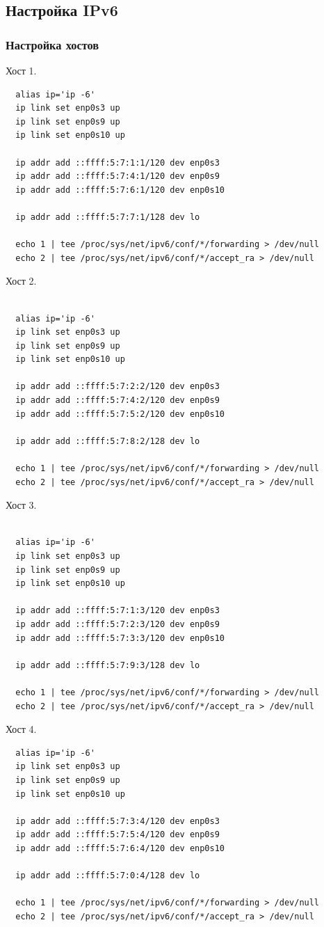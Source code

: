 \documentclass[11pt, a4paper] {ncc}
\begin{document}
    \subsection*{Настройка IPv6}
        \subsubsection*{Настройка хостов}
		Хост 1.
\begin{verbatim}
  alias ip='ip -6'
  ip link set enp0s3 up
  ip link set enp0s9 up
  ip link set enp0s10 up

  ip addr add ::ffff:5:7:1:1/120 dev enp0s3
  ip addr add ::ffff:5:7:4:1/120 dev enp0s9
  ip addr add ::ffff:5:7:6:1/120 dev enp0s10

  ip addr add ::ffff:5:7:7:1/128 dev lo

  echo 1 | tee /proc/sys/net/ipv6/conf/*/forwarding > /dev/null
  echo 2 | tee /proc/sys/net/ipv6/conf/*/accept_ra > /dev/null

\end{verbatim}

	Хост 2.
\begin{verbatim}

  alias ip='ip -6'
  ip link set enp0s3 up
  ip link set enp0s9 up
  ip link set enp0s10 up

  ip addr add ::ffff:5:7:2:2/120 dev enp0s3
  ip addr add ::ffff:5:7:4:2/120 dev enp0s9
  ip addr add ::ffff:5:7:5:2/120 dev enp0s10

  ip addr add ::ffff:5:7:8:2/128 dev lo

  echo 1 | tee /proc/sys/net/ipv6/conf/*/forwarding > /dev/null
  echo 2 | tee /proc/sys/net/ipv6/conf/*/accept_ra > /dev/null

\end{verbatim}

	Хост 3.
\begin{verbatim}

  alias ip='ip -6'
  ip link set enp0s3 up
  ip link set enp0s9 up
  ip link set enp0s10 up

  ip addr add ::ffff:5:7:1:3/120 dev enp0s3
  ip addr add ::ffff:5:7:2:3/120 dev enp0s9
  ip addr add ::ffff:5:7:3:3/120 dev enp0s10

  ip addr add ::ffff:5:7:9:3/128 dev lo

  echo 1 | tee /proc/sys/net/ipv6/conf/*/forwarding > /dev/null
  echo 2 | tee /proc/sys/net/ipv6/conf/*/accept_ra > /dev/null
\end{verbatim}

	Хост 4.
\begin{verbatim}
  alias ip='ip -6'
  ip link set enp0s3 up
  ip link set enp0s9 up
  ip link set enp0s10 up

  ip addr add ::ffff:5:7:3:4/120 dev enp0s3
  ip addr add ::ffff:5:7:5:4/120 dev enp0s9
  ip addr add ::ffff:5:7:6:4/120 dev enp0s10

  ip addr add ::ffff:5:7:0:4/128 dev lo

  echo 1 | tee /proc/sys/net/ipv6/conf/*/forwarding > /dev/null
  echo 2 | tee /proc/sys/net/ipv6/conf/*/accept_ra > /dev/null

\end{verbatim}
\end{document}
